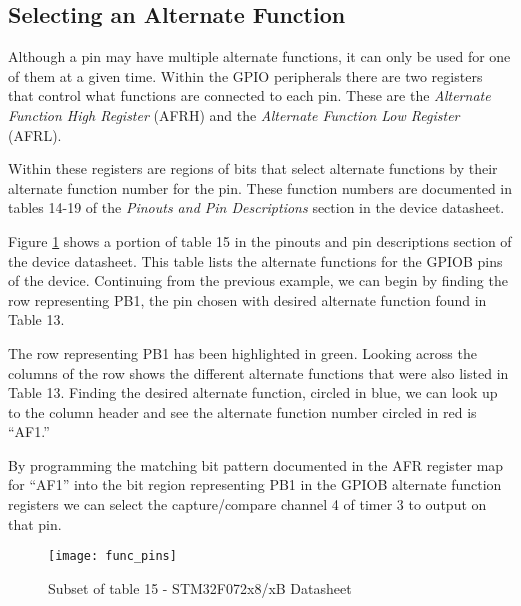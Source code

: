 \documentclass[11pt,fleqn]{book} %
\begin{document}
    \subsection{Selecting an Alternate Function}
    Although a pin may have multiple alternate functions, it can only be used for one of them at a given time. Within the GPIO peripherals there are two registers that control what functions are connected to each pin. These are the \textit{Alternate Function High Register} (AFRH) and the  \textit{Alternate Function Low Register} (AFRL). 
    
    Within these registers are regions of bits that select alternate functions by their alternate function number for the pin. These function numbers are documented in tables 14-19 of the \textit{Pinouts and Pin Descriptions} section in the device datasheet. 
%    

   	
    \begin{example} 
Figure \ref{func_pins} shows a portion of table 15 in the pinouts and pin descriptions section of the device datasheet. This table lists the alternate functions for the GPIOB pins of the device. Continuing from the previous example, we can begin by finding the row representing PB1, the pin chosen with desired alternate function found in Table 13. 

The row representing PB1 has been highlighted in green. Looking across the columns of the row shows the different alternate functions that were also listed in Table 13. Finding the desired alternate function, circled in blue, we can look up to the column header and see the alternate function number circled in red is ``AF1.'' 

By programming the matching bit pattern documented in the AFR register map for ``AF1'' into the bit region representing PB1 in the GPIOB alternate function registers we can select the capture/compare channel 4 of timer 3 to output on that pin.  
    \end{example}

    \begin{figure}[]
    \centering\texttt{[image: func\_pins]}
    \caption{Subset of table 15 - STM32F072x8/xB Datasheet}
    \label{func_pins}
\end{figure}
    
\end{document}

